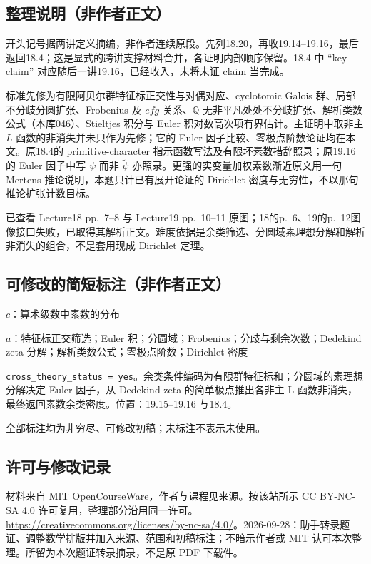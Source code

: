 \documentclass[UTF8,11pt]{ctexart}
\theoremstyle{definition}
\newcommand{\Q}{\mathbb Q}
\begin{document}
\subsection*{整理说明（非作者正文）}
开头记号据两讲定义摘编，非作者连续原段。先列18.20，再收19.14--19.16，最后返回18.4；这是显式的跨讲支撑材料合并，各证明内部顺序保留。18.4 中 ``key claim'' 对应随后一讲19.16，已经收入，未将未证 claim 当完成。

标准先修为有限阿贝尔群特征标正交性与对偶对应、cyclotomic Galois 群、局部不分歧分圆扩张、Frobenius 及 $efg$ 关系、$\Q$ 无非平凡处处不分歧扩张、解析类数公式（本库046）、Stieltjes 积分与 Euler 积对数高次项有界估计。主证明中取非主 $L$ 函数的非消失并未只作为先修；它的 Euler 因子比较、零极点阶数论证均在本文。原18.4的 primitive-character 指示函数写法及有限坏素数措辞照录；原19.16的 Euler 因子中写 $\psi$ 而非 $\widetilde\psi$ 亦照录。更强的实变量加权素数渐近原文用一句 Mertens 推论说明，本题只计已有展开论证的 Dirichlet 密度与无穷性，不以那句推论扩张计数目标。

已查看 Lecture18 pp.~7--8 与 Lecture19 pp.~10--11 原图；18的p.~6、19的p.~12图像接口失败，已取得其解析正文。难度依据是余类筛选、分圆域素理想分解和解析非消失的组合，不是套用现成 Dirichlet 定理。
\subsection*{可修改的简短标注（非作者正文）}
$c$：算术级数中素数的分布

$a$：特征标正交筛选；Euler 积；分圆域；Frobenius；分歧与剩余次数；Dedekind zeta 分解；解析类数公式；零极点阶数；Dirichlet 密度

\texttt{cross\_theory\_status = yes}。余类条件编码为有限群特征标和；分圆域的素理想分解决定 Euler 因子，从 Dedekind zeta 的简单极点推出各非主 L 函数非消失，最终返回素数余类密度。位置：19.15--19.16 与18.4。

全部标注均为非穷尽、可修改初稿；未标注不表示未使用。
\subsection*{许可与修改记录}
材料来自 MIT OpenCourseWare，作者与课程见来源。按该站所示 CC BY-NC-SA 4.0 许可复用，整理部分沿用同一许可。\url{https://creativecommons.org/licenses/by-nc-sa/4.0/}。2026-09-28：助手转录题证、调整数学排版并加入来源、范围和初稿标注；不暗示作者或 MIT 认可本次整理。所留为本次题证转录摘录，不是原 PDF 下载件。
\end{document}

